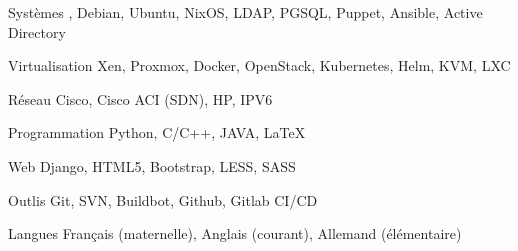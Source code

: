

\begin{cvskills}

  \cvskill
    {Systèmes} %
	{, Debian, Ubuntu, NixOS, LDAP, PGSQL, Puppet, Ansible, Active Directory} %

  \cvskill
    {Virtualisation } %
    {Xen, Proxmox, Docker, OpenStack, Kubernetes, Helm, KVM, LXC} %

  \cvskill
    {Réseau} %
	{Cisco, Cisco ACI (SDN), HP, IPV6} %

  \cvskill
    {Programmation} %
    {Python, C/C++, JAVA, LaTeX} %

  \cvskill
    {Web} %
    {Django, HTML5, Bootstrap, LESS, SASS} %

  \cvskill
    {Outlis} %
    {Git, SVN, Buildbot, Github, Gitlab CI/CD} %

  \cvskill
    {Langues} %
    {Français (maternelle), Anglais (courant), Allemand (élémentaire)} %

\end{cvskills}

